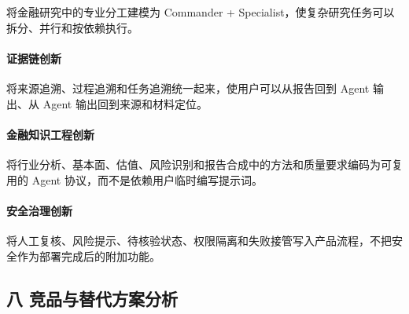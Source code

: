\documentclass[a4paper,12pt,fontset=none]{ctexart}
\begin{document}
将金融研究中的专业分工建模为 Commander +
Specialist，使复杂研究任务可以拆分、并行和按依赖执行。

\paragraph{证据链创新}\label{ux8bc1ux636eux94feux521bux65b0}

将来源追溯、过程追溯和任务追溯统一起来，使用户可以从报告回到 Agent
输出、从 Agent 输出回到来源和材料定位。

\paragraph{金融知识工程创新}\label{ux91d1ux878dux77e5ux8bc6ux5de5ux7a0bux521bux65b0}

将行业分析、基本面、估值、风险识别和报告合成中的方法和质量要求编码为可复用的
Agent 协议，而不是依赖用户临时编写提示词。

\paragraph{安全治理创新}\label{ux5b89ux5168ux6cbbux7406ux521bux65b0}

将人工复核、风险提示、待核验状态、权限隔离和失败接管写入产品流程，不把安全作为部署完成后的附加功能。

\subsection{八
竞品与替代方案分析}\label{ux516b-ux7adeux54c1ux4e0eux66ffux4ee3ux65b9ux6848ux5206ux6790}
\end{document}

